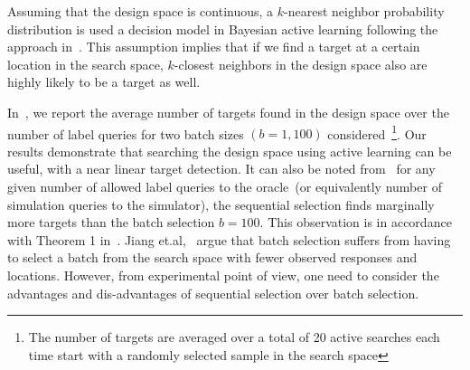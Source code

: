 Assuming that the design space is continuous, a \(k\)-nearest neighbor probability distribution is used a decision model in Bayesian active learning following the approach in~\cite{jiang2018efficient}. 
This assumption implies that if we find a target at a certain location in the search space, \(k\)-closest neighbors in the design space also are highly likely to be a target as well. 



In~, we report the average number of targets found in the design space over the number of label queries for two batch sizes \((b=1,100)\) considered~\footnote{The number of targets are averaged over a total of 20 active searches each time start with a randomly selected sample in the search space}.
Our results demonstrate that searching the design space using active learning can be useful, with a near linear target detection. 
It can also be noted from~ for any given number of allowed label queries to the oracle~(or equivalently number of simulation queries to the simulator), the sequential selection finds marginally more targets than the batch selection \(b=100\).
This observation is in accordance with Theorem 1 in~\cite{jiang2018efficient}. 
Jiang et.al,~\cite{jiang2018efficient} argue that batch selection suffers from having to select a batch from the search space with fewer observed responses and locations. 
However, from experimental point of view, one need to consider the advantages and dis-advantages of sequential selection over batch selection. 
